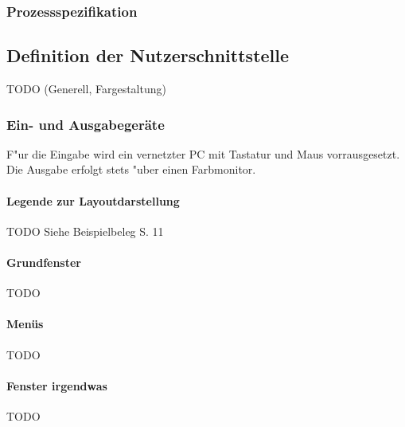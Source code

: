 \subsubsection{Prozessspezifikation}






\subsection{Definition der Nutzerschnittstelle}
TODO (Generell, Fargestaltung)

\subsubsection{Ein- und Ausgabegeräte}
F"ur die Eingabe wird ein vernetzter PC mit Tastatur und Maus vorrausgesetzt.\\
Die Ausgabe erfolgt stets "uber einen Farbmonitor.

\paragraph{Legende zur Layoutdarstellung}
TODO Siehe Beispielbeleg S. 11

\paragraph{Grundfenster}
TODO

\paragraph{Menüs}
TODO

\paragraph{Fenster irgendwas}
TODO
